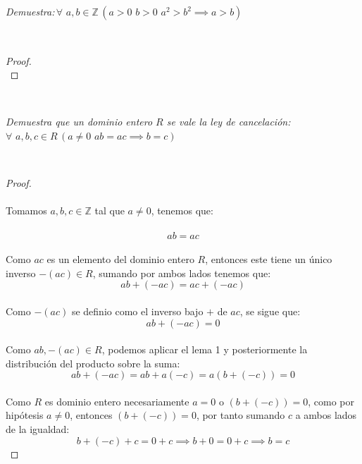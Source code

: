 \documentclass[11pt,letterpaper]{article}
\newcommand{\Z}{\mathbb{Z}}
\begin{document}
\begin{tcolorbox}[
	title = \textcolor{black}{\textcolor{white}{Problema 4}},]
\textit{Demuestra:\,$\forall\,\,a,b\in \Z\,(a>0\,\,b>0\,\,a^2>b^2 \implies a>b)$
}
\end{tcolorbox}\,\\
\begin{proof}\,\\

    
\end{proof}\,\\
\begin{tcolorbox}[
	title = \textcolor{black}{\textcolor{white}{Problema 5}},]
\textit{Demuestra que un dominio entero $R$ se vale la ley de cancelaci\'on:\,\,$\forall\,\,a,b,c\in R\,(a\neq 0\,\,ab=ac \implies b=c)$
}
\end{tcolorbox}\,\\
    \begin{proof}\,\\
    \,\\
    Tomamos  $a,b,c\in \Z$ tal que $a\neq 0$, tenemos que:\,\\
    \,\\
    \begin{equation*}
        ab=ac
    \end{equation*}\,\\
    Como $ac$ es un elemento del dominio entero $R$, entonces este tiene un \'unico inverso $-(ac)\in R$, sumando por ambos
    lados tenemos que:\,\\
    \begin{equation*}
        ab+(-ac)=ac+(-ac)
    \end{equation*}\,\\
    Como $-(ac)$ se definio como el inverso bajo $+$ de $ac$, se sigue que:\,\\
    \begin{equation*}
        ab+(-ac)=0
    \end{equation*}\,\\
    Como $ab,-(ac)\in R$, podemos aplicar el lema 1 y posteriormente la distribuci\'on del producto sobre la suma:\,\\
    \begin{equation*}
        ab+(-ac)=ab+a(-c)=a(b+(-c))=0
    \end{equation*}\,\\
    Como $R$ es dominio entero necesariamente $a=0$ o $(b+(-c))=0$, como por hip\'otesis $a\neq 0$, entonces
    $(b+(-c))=0$, por tanto sumando $c$ a ambos lados de la igualdad:\,\\
    \begin{equation*}
        b+(-c)+c=0+c\implies b+0=0+c\implies b=c
    \end{equation*}
\end{proof}\,\\
\end{document}
